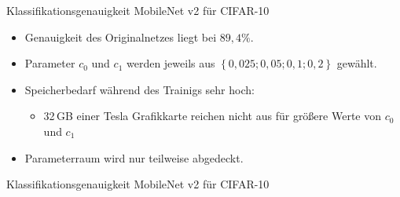 \documentclass[aspectratio=169, 12pt]{beamer}
\begin{document}
\begin{frame}{Klassifikationsgenauigkeit MobileNet v2 für CIFAR-10}
  \begin{itemize}
    \item Genauigkeit des Originalnetzes liegt bei $89{,}4\%$.
    \item Parameter $c_0$ und $c_1$ werden jeweils aus $\left\lbrace 0{,}025; 0{,}05; 0{,}1; 0{,}2 \right\rbrace$ gewählt.
    \item Speicherbedarf während des Trainigs sehr hoch:
    \begin{itemize}
      \item 32${\,}$GB einer Tesla Grafikkarte reichen nicht aus für größere Werte von $c_0$ und $c_1$
    \end{itemize}
  \item Parameterraum wird nur teilweise abgedeckt.
  \end{itemize}  
\end{frame}

\begin{frame}{Klassifikationsgenauigkeit MobileNet v2 für CIFAR-10}
  \begin{figure}
\end{figure}
\end{frame}
\end{document}
